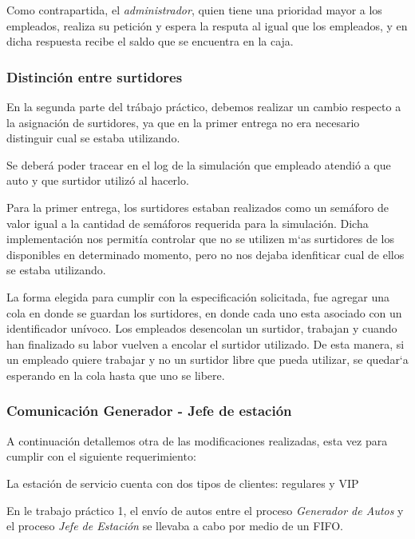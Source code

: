 \documentclass[12pt,a4paper,spanish]{article}
\begin{document}
	Como contrapartida, el \emph{administrador}, quien tiene una prioridad mayor a los empleados, realiza su
	petición y espera la resputa al igual que los empleados, y en dicha respuesta recibe el saldo que se 
	encuentra en la caja.

	\subsubsection{Distinción entre surtidores}

	En la segunda parte del trábajo práctico, debemos realizar un cambio respecto a la asignación de surtidores,
	ya que en la primer entrega no era necesario distinguir cual se estaba utilizando. 
	
	\begin{framed}
	Se deberá poder tracear en el log de la simulación que empleado atendió a que auto y que surtidor
	utilizó al hacerlo.
	\end{framed}

	Para la primer entrega, los surtidores estaban realizados como un semáforo de valor igual a la cantidad
	de semáforos requerida para la simulación. Dicha implementación nos permitía controlar que no se 
	utilizen m`as surtidores de los disponibles en determinado momento, pero no nos dejaba idenfiticar
	cual de ellos se estaba utilizando.

	La forma elegida para cumplir con la especificación solicitada, fue agregar una cola en donde se guardan
	los surtidores, en donde cada uno esta asociado con un identificador unívoco. Los empleados desencolan
	un surtidor, trabajan y cuando han finalizado su labor vuelven a encolar el surtidor utilizado. De esta manera, si un empleado quiere trabajar y no un surtidor libre que pueda utilizar, se quedar`a esperando en la cola hasta que uno se libere.

	\subsubsection{Comunicación Generador - Jefe de estación}

	A continuación detallemos otra de las modificaciones realizadas, esta vez para cumplir con el siguiente requerimiento:
	
	\begin{framed}
	La estación de servicio cuenta con dos tipos de clientes: regulares y VIP
	\end{framed}

	En le trabajo práctico 1, el envío de autos entre el proceso \emph{Generador de Autos} y el proceso \emph{Jefe de Estación}
	se llevaba a cabo por medio de un FIFO. 
\end{document}

